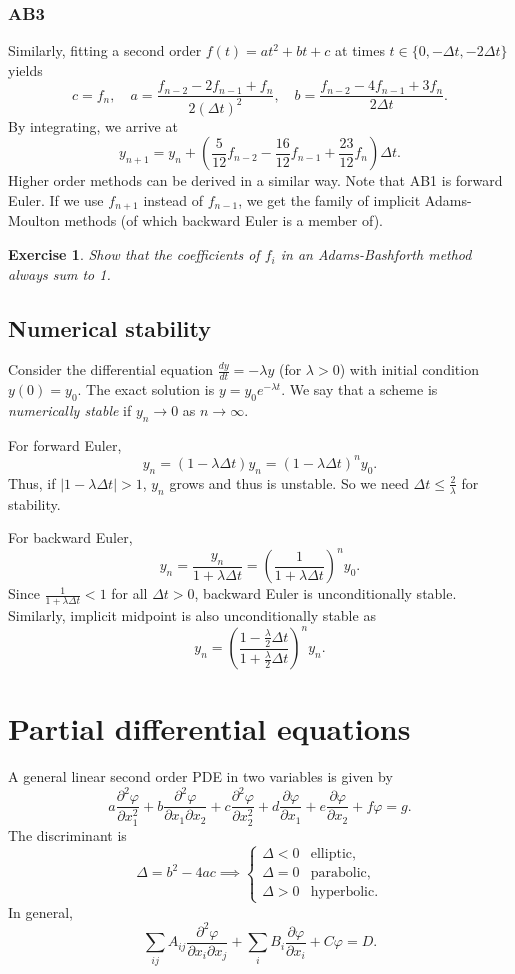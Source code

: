\documentclass[11pt, a4paper]{article}
\renewcommand{\phi}{\varphi}
\theoremstyle{break}
\newtheorem{ex}[thm]{Exercise}
\newcommand*{\set}[1]{\{#1\}}%
\newcommand*{\Paren}[1]{\left(#1\right)}%
\newcommand{\dt}{\Delta t}
\newcommand{\der}[2]{\frac{\partial #1}{\partial #2}}
\newcommand{\pder}[3][2]{\frac{\partial^#1 #2}{\partial #3^#1}}
\newcommand{\dder}[2]{\frac{d #1}{d #2}}
\begin{document}
\subsubsection{AB3}
Similarly, fitting a second order $f(t)=at^2+bt+c$ at times $t\in\set{0,-\dt,-2\dt}$ yields \[c=f_n,\quad a=\frac{f_{n-2}-2f_{n-1}+f_n}{2(\dt)^2}, \quad b=\frac{f_{n-2}-4f_{n-1}+3f_n}{2\dt}.\] By integrating, we arrive at \[y_{n+1}=y_n+\Paren{\frac5{12}f_{n-2}-\frac{16}{12}f_{n-1}+\frac{23}{12}f_n}\dt.\]
Higher order methods can be derived in a similar way. Note that AB1 is forward Euler. If we use $f_{n+1}$ instead of $f_{n-1}$, we get the family of implicit Adams-Moulton methods (of which backward Euler is a member of).
\begin{ex}
	Show that the coefficients of $f_i$ in an Adams-Bashforth method always sum to 1.
\end{ex}

\subsection{Numerical stability}
Consider the differential equation $\dder yt=-\lambda y$ (for $\lambda>0$) with initial condition $y(0)=y_0$. The exact solution is $y=y_0e^{-\lambda t}$. We say that a scheme is \emph{numerically stable} if $y_n\to 0$ as $n\to \infty$.

For forward Euler, \[y_{n}=(1-\lambda \dt)y_n =(1-\lambda \dt)^ny_0.\] Thus, if $|1-\lambda \dt|>1$, $y_n$ grows and thus is unstable. So we need $\dt\leq\frac2\lambda$ for stability. 

For backward Euler, \[y_n=\frac{y_n}{1+\lambda \dt}=\Paren{\frac{1}{1+\lambda\dt}}^ny_0.\] Since $\frac{1}{1+\lambda\dt}<1$ for all $\dt>0$, backward Euler is unconditionally stable. Similarly, implicit midpoint is also unconditionally stable as \[y_n=\Paren{\frac{1-\frac\lambda2\dt}{1+\frac\lambda2\dt}}^ny_n.\]

\section{Partial differential equations}
	A general linear second order PDE in two variables is given by \[a\pder\phi{x_1}+b\frac{\partial^2\phi}{\partial x_1\partial x_2}+c\pder\phi{x_2}+d\der\phi{x_1}+e\der\phi{x_2}+f\phi = g.\]
The discriminant is \[\Delta = b^2-4ac \implies \begin{cases}
	\Delta<0 & \text{elliptic},\\ \Delta =0& \text{parabolic}, \\\Delta>0 &\text{hyperbolic}.
\end{cases}\]
In general, \[\sum_{ij}A_{ij}\frac{\partial^2\phi}{\partial x_i\partial x_j}+\sum_i B_i\der\phi{x_i}+C\phi = D.\]
\end{document}
